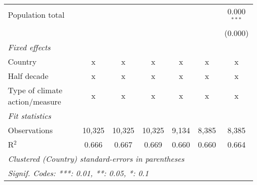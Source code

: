 \begin{tabular}{lcccccc}
   Population total                                                       &         &               &                &                &                & 0.000$^{***}$\\   
                                                                          &         &               &                &                &                & (0.000)\\   
   \emph{Fixed effects}\\
   Country                                                                & x       & x             & x              & x              & x              & x\\  
   Half decade                                                            & x       & x             & x              & x              & x              & x\\  
   Type of climate action/measure                                         & x       & x             & x              & x              & x              & x\\  
   \midrule \emph{Fit statistics}\\
   Observations                                                           & 10,325  & 10,325        & 10,325         & 9,134          & 8,385          & 8,385\\  
   R$^2$                                                                  & 0.666   & 0.667         & 0.669          & 0.660          & 0.660          & 0.664\\  
   \midrule
   \multicolumn{7}{l}{\emph{Clustered (Country) standard-errors in parentheses}}\\
   \multicolumn{7}{l}{\emph{Signif. Codes: ***: 0.01, **: 0.05, *: 0.1}}\\
\end{tabular}
\par\endgroup


